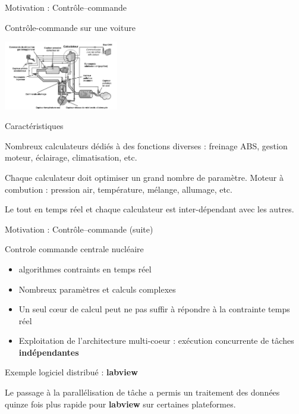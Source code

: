 \documentclass[handout]{beamer}
\begin{document}
\begin{frame}[fragile]{Motivation : Contrôle--commande}

\begin{block}{Contrôle-commande sur une voiture}

\center\includegraphics[height=3cm]{ControleCommande}
\end{block}

\begin{block}{Caractéristiques}

Nombreux calculateurs dédiés à des fonctions diverses : freinage ABS, gestion moteur, éclairage,
climatisation, etc.

Chaque calculateur doit optimiser un grand nombre de paramètre. Moteur à combution : pression air,
température, mélange, allumage, etc.

Le tout en temps réel et chaque calculateur est inter-dépendant avec les autres. 
\end{block}

\end{frame}

\begin{frame}[fragile]{Motivation : Contrôle--commande (suite)}

\begin{block}{Controle commande centrale nucléaire}
\begin{itemize}
 \item algorithmes contraints en temps réel
 \item Nombreux paramètres et calculs complexes
 \item Un seul c{\oe}ur de calcul peut ne pas suffir à répondre à la contrainte temps réel
 \item Exploitation de l'architecture multi-coeur : exécution concurrente de tâches \textbf{indépendantes}
\end{itemize}
\end{block}

\begin{block}{Exemple logiciel distribué : \textbf{labview}}

Le passage à la parallélisation de tâche a permis un traitement des données quinze fois plus rapide 
pour \textbf{labview} sur certaines plateformes. 

\end{block}

\end{frame}
\end{document}

